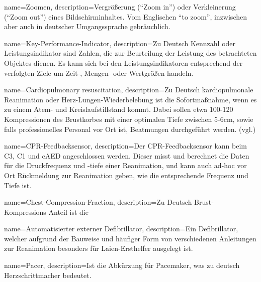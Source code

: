 

{
     name=Zoomen,
     description={Vergrößerung ("`Zoom in"') oder Verkleinerung ("`Zoom out"') eines Bildschirminhaltes. Vom Englischen "`to zoom"', inzwischen aber auch in deutscher Umgangssprache gebräuchlich.}
}

{
     name=Key-Performance-Indicator,
     description={Zu Deutsch Kennzahl oder Leistungsindikator sind \glqq Zahlen, die zur Beurteilung der Leistung des betrachteten Objektes dienen. Es kann sich bei den Leistungsindikatoren entsprechend der verfolgten Ziele um Zeit-, Mengen- oder Wertgrößen handeln.\grqq{}  \cite[S. 342, S. 3f]{Friedl.2003, Maute.2009} }
}

{
     name=Cardiopulmonary resuscitation,
     description={Zu Deutsch kardiopulmonale Reanimation oder Herz-Lungen-Wiederbelebung ist die Sofortmaßnahme, wenn es zu einem Atem- und Kreislaufstillstand kommt. Dabei sollen etwa 100-120 Kompressionen des Brustkorbes mit einer optimalen Tiefe zwischen 5-6cm, sowie falls professionelles Personal vor Ort ist, Beatmungen durchgeführt werden. (vgl.\cite{Nolan.2010, Monsieurs.2015}) }
}

{
     name=CPR-Feedbacksensor,
     description={Der CPR-Feedbacksensor kann beim \gls{C3}, \gls{C1} und \gls{cAED} angeschlossen werden. Dieser misst und berechnet die Daten für die Druckfrequenz und -tiefe einer Reanimation, und kann auch ad-hoc vor Ort Rückmeldung zur Reanimation geben, wie die entsprechende Frequenz und Tiefe ist.}
}

{
     name=Chest-Compression-Fraction,
     description={Zu Deutsch Brust-Kompressions-Anteil ist die \todo }
}

{
     name=Automatisierter externer Defibrillator,
     description={Ein Defibrillator, welcher aufgrund der Bauweise und häufiger Form von verschiedenen Anleitungen zur Reanimation besonders für Laien-Ersthelfer ausgelegt ist.}
}

{
     name=Pacer,
     description={Ist die Abkürzung für \glqq Pacemaker\grqq{}, was zu deutsch Herzschrittmacher bedeutet. }
}



